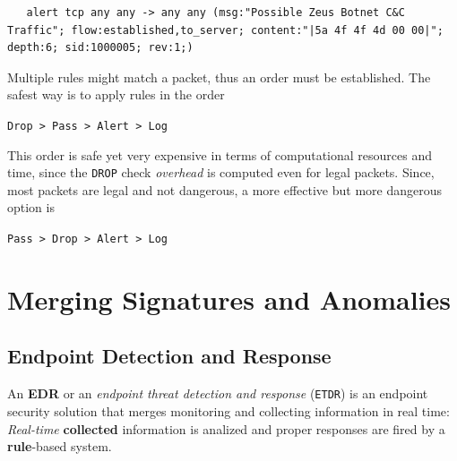 \begin{lstlisting}
   alert tcp any any -> any any (msg:"Possible Zeus Botnet C&C Traffic"; flow:established,to_server; content:"|5a 4f 4f 4d 00 00|"; depth:6; sid:1000005; rev:1;)
\end{lstlisting}


Multiple rules might match a packet,
thus an order must be established.
The safest way is to apply rules in the order
\begin{center}
   \texttt{Drop > Pass > Alert > Log}
\end{center}
This order is safe yet very expensive in terms of computational resources and time,
since the \texttt{DROP} check \textit{overhead} is computed even for legal packets.
Since, most packets are legal and not dangerous,
a more effective but more dangerous option is
\begin{center}
   \texttt{Pass > Drop > Alert > Log}
\end{center}

\section{Merging Signatures and Anomalies}
\subsection{Endpoint Detection and Response}
An \textbf{EDR} or an \textit{endpoint threat detection and response} (\texttt{ETDR}) is an endpoint
security solution that merges monitoring and collecting information in
real time:
\textit{Real-time} \textbf{collected} information is analized and proper responses are fired by a \textbf{rule}-based system.

